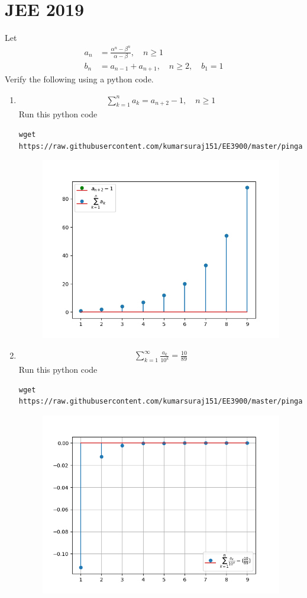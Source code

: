 \documentclass[journal,12pt,twocolumn]{IEEEtran}
\renewcommand\thesection{\arabic{section}}
\begin{document}
\section{JEE 2019}
Let 
\begin{align}
	a_n &= \frac{\alpha^{n}-\beta^{n}}{\alpha - \beta}, \quad n \ge 1
	\\
	b_n &= a_{n-1} + a_{n+1}, \quad n \ge 2, \quad b_1 =1
	\label{eq:10-orig-diff}
\end{align}
Verify the following using a python code.
\begin{enumerate}[label=\thesection.\arabic*
,ref=\thesection.\theenumi]
\item 
\begin{align}
	\sum_{k=1}^{n}a_k = a_{n+2}-1, \quad n \ge 1
\end{align}
\solution  Run this python code 
\begin{lstlisting}
wget https://raw.githubusercontent.com/kumarsuraj151/EE3900/master/pingala/codes/1_1.py
\end{lstlisting}
\begin{figure}[h]
	\centering
	\includegraphics[width=0.7\columnwidth]{./figs/1_1.png}
	\caption{}
\end{figure}
 \item 
\begin{align}
	\sum_{k=1}^{\infty}\frac{a_k}{10^k} =\frac{10}{89}
\end{align}
\solution  Run this python code 
\begin{lstlisting}
wget https://raw.githubusercontent.com/kumarsuraj151/EE3900/master/pingala/codes/1_1.py
\end{lstlisting}
\begin{figure}[h]
	\centering
	\includegraphics[width=0.7\columnwidth]{./figs/1_2.png}

\end{figure}
\end{enumerate}
\end{document}
